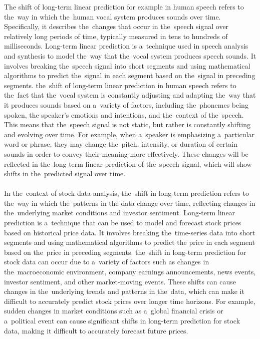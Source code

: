The shift of long-term linear prediction for example in human speech refers to the~way in which the~human vocal system produces sounds over time.
Specifically, it describes the~changes that occur in the~speech signal over relatively long periods of time, typically
measured in tens to hundreds of milliseconds. Long-term linear prediction is a~technique used in speech analysis and
synthesis to model the~way that the~vocal system produces speech sounds. It involves breaking the~speech signal into
short segments and using mathematical algorithms to predict the~signal in each segment based on the~signal in preceding
segments. the~shift of long-term linear prediction in human speech refers to the~fact that the~vocal system is constantly
adjusting and adapting the~way that it produces sounds based on a~variety of factors, including the~phonemes being spoken,
the speaker's emotions and intentions, and the~context of the~speech. This means that the~speech signal is not static,
but rather is constantly shifting and evolving over time. For example, when a~speaker is emphasizing a~particular
word or phrase, they may change the~pitch, intensity, or duration of certain sounds in order to convey their meaning
more effectively. These changes will be reflected in the~long-term linear prediction of the~speech signal, which will
show shifts in the~predicted signal over time.\\
\\
In the~context of stock data analysis, the~shift in long-term prediction refers to the~way in which the~patterns in
the data change over time, reflecting changes in the~underlying market conditions and investor sentiment.
Long-term linear prediction is a~technique that can be used to model and forecast stock prices based on historical
price data. It involves breaking the~time-series data into short segments and using mathematical algorithms to predict
the price in each segment based on the~price in preceding segments. the~shift in long-term prediction for stock data
can occur due to a~variety of factors such as changes in the~macroeconomic environment, company earnings announcements,
news events, investor sentiment, and other market-moving events. These shifts can cause changes in the~underlying trends
and patterns in the~data, which can make it difficult to accurately predict stock prices over longer time horizons.
For example, sudden changes in market conditions such as a~global financial crisis or a~political event can cause
significant shifts in long-term prediction for stock data, making it difficult to accurately forecast future prices.
